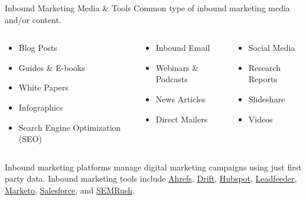 \documentclass[pdf]{beamer}
\theoremstyle{remark}
\theoremstyle{definition}
\begin{document}
\begin{frame}[t]{Inbound Marketing Media \& Tools}
Common type of inbound marketing media and/or content. \\
\vspace{2.0ex}
\begin{columns}[T]
\begin{column}{0.3\textwidth}
\begin{itemize}
\item Blog Posts
\vspace{1.0ex}
\item Guides \& E-books
\vspace{1.0ex}
\item White Papers
\vspace{1.0ex}
\item Infographics
\vspace{1.5ex}
\item Search Engine Optimization (SEO)
\end{itemize}
\end{column}
\begin{column}{0.3\textwidth} 
 \begin{itemize}
\item Inbound Email 
\vspace{1.0ex}
\item Webinars \& Podcasts
\vspace{1.0ex}
\item News Articles
\vspace{1.0ex}
\item Direct Mailers
\end{itemize} 
\end{column}
\begin{column}{0.3\textwidth} 
\begin{itemize}
\item Social Media
\vspace{1.0ex}
\item Research Reports
\vspace{1.0ex}
\item Slideshare
\vspace{1.0ex}
\item Videos 
\end{itemize}  
\end{column}
\end{columns}
Inbound marketing platforms manage digital marketing campaigns using just first party data. Inbound marketing tools include \href{https://ahrefs.com/}{Ahrefs}, \href{https://www.drift.com/}{Drift}, \href{https://www.hubspot.com/}{Hubspot}, \href{https://www.leadfeeder.com/}{Leadfeeder}, \href{https://www.marketo.com/}{Marketo}, \href{https://www.salesforce.com/}{Salesforce}, and \href{https://www.semrush.com/}{SEMRush}.
\end{frame}
\end{document}
